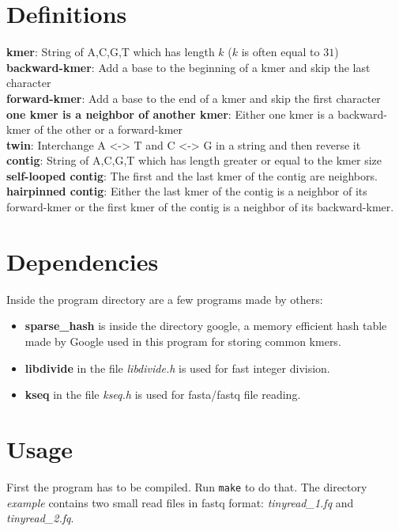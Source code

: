 \documentclass[a4paper]{report}
\renewcommand{\b}[1]{\textbf{#1}}  %
\newcommand{\e}[1]{\emph{#1}}    %
\begin{document}
\chapter{Definitions}
\b{kmer}\cite{wiki:kmer}: String of A,C,G,T which has length $k$ ($k$ is often equal to $31$) \\
\b{backward-kmer}: Add a base to the beginning of a kmer and skip the last character\\
\b{forward-kmer}: Add a base to the end of a kmer and skip the first character\\
\b{one kmer is a neighbor of another kmer}: Either one kmer is a backward-kmer of the other or a forward-kmer\\
\b{twin}: Interchange A <-> T and C <-> G in a string and then reverse it \\
\b{contig}: String of A,C,G,T which has length greater or equal to the kmer size\\
\b{self-looped contig}: The first and the last kmer of the contig are neighbors.\\
\b{hairpinned contig}: Either the last kmer of the contig is a neighbor of its forward-kmer or
the first kmer of the contig is a neighbor of its backward-kmer. 
\\[8pt]

\chapter{Dependencies}
Inside the program directory are a few programs made by others:

\begin{itemize}
\item \b{sparse\_hash}\cite{sparsehash} is inside the directory google, a memory efficient hash table made by Google
    used in this program for storing common kmers.
\item \b{libdivide}\cite{libdivide} in the file \emph{libdivide.h} is used for fast integer division.
\item \b{kseq}\cite{kseq} in the file \emph{kseq.h} is used for fasta/fastq file reading.
\end{itemize}

\chapter{Usage}
First the program has to be compiled. Run {\verb `make` } to do that.
The directory \e{example} contains two small  read files in fastq format: 
\e{tinyread\_1.fq} and \e{tinyread\_2.fq}.\\[4pt]
\end{document}
